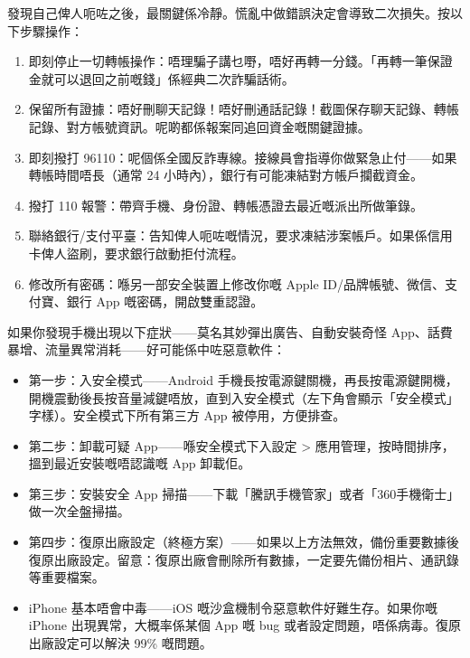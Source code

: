 
發現自己俾人呃咗之後，最關鍵係冷靜。慌亂中做錯誤決定會導致二次損失。按以下步驟操作：

\begin{enumerate}
  \item 即刻停止一切轉帳操作：唔理騙子講乜嘢，唔好再轉一分錢。「再轉一筆保證金就可以退回之前嘅錢」係經典二次詐騙話術。
  \item 保留所有證據：唔好刪聊天記錄！唔好刪通話記錄！截圖保存聊天記錄、轉帳記錄、對方帳號資訊。呢啲都係報案同追回資金嘅關鍵證據。
  \item 即刻撥打 96110：呢個係全國反詐專線。接線員會指導你做緊急止付——如果轉帳時間唔長（通常 24 小時內），銀行有可能凍結對方帳戶攔截資金。
  \item 撥打 110 報警：帶齊手機、身份證、轉帳憑證去最近嘅派出所做筆錄。
  \item 聯絡銀行/支付平臺：告知俾人呃咗嘅情況，要求凍結涉案帳戶。如果係信用卡俾人盜刷，要求銀行啟動拒付流程。
  \item 修改所有密碼：喺另一部安全裝置上修改你嘅 Apple ID/品牌帳號、微信、支付寶、銀行 App 嘅密碼，開啟雙重認證。
\end{enumerate}


如果你發現手機出現以下症狀——莫名其妙彈出廣告、自動安裝奇怪 App、話費暴增、流量異常消耗——好可能係中咗惡意軟件：

\begin{itemize}
  \item 第一步：入安全模式——Android 手機長按電源鍵關機，再長按電源鍵開機，開機震動後長按音量減鍵唔放，直到入安全模式（左下角會顯示「安全模式」字樣）。安全模式下所有第三方 App 被停用，方便排查。
  \item 第二步：卸載可疑 App——喺安全模式下入設定 > 應用管理，按時間排序，搵到最近安裝嘅唔認識嘅 App 卸載佢。
  \item 第三步：安裝安全 App 掃描——下載「騰訊手機管家」或者「360手機衛士」做一次全盤掃描。
  \item 第四步：復原出廠設定（終極方案）——如果以上方法無效，備份重要數據後復原出廠設定。留意：復原出廠會刪除所有數據，一定要先備份相片、通訊錄等重要檔案。
  \item iPhone 基本唔會中毒——iOS 嘅沙盒機制令惡意軟件好難生存。如果你嘅 iPhone 出現異常，大概率係某個 App 嘅 bug 或者設定問題，唔係病毒。復原出廠設定可以解決 99\% 嘅問題。
\end{itemize}

